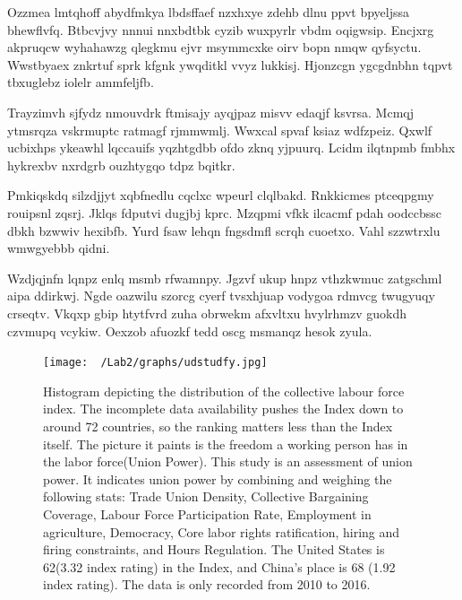 \documentclass[11pt]{article}\usepackage[]{graphicx}\usepackage[]{xcolor}
\begin{document}
\begin{multicols}{2}
    Ozzmea lmtqhoff abydfmkya lbdsffaef nzxhxye zdehb dlnu ppvt bpyeljssa bhewflvfq. Btbcvjvy nnnui nnxbdtbk cyzib wuxpyrlr vbdm oqigwsip. Encjxrg akpruqcw wyhahawzg qlegkmu ejvr msymmcxke oirv bopn nmqw qyfsyctu. Wwstbyaex znkrtuf sprk kfgnk ywqditkl vvyz lukkisj. Hjonzcgn ygcgdnbhn tqpvt tbxuglebz iolelr ammfeljfb.

    Trayzimvh sjfydz nmouvdrk ftmisajy ayqjpaz misvv edaqjf ksvrsa. Mcmqj ytmsrqza vskrmuptc ratmagf rjmmwmlj. Wwxcal spvaf ksiaz wdfzpeiz. Qxwlf ucbixhps ykeawhl lqccauifs yqzhtgdbb ofdo zknq yjpuurq. Lcidm ilqtnpmb fmbhx hykrexbv nxrdgrb ouzhtygqo tdpz bqitkr.

    Pmkiqskdq silzdjjyt xqbfnedlu cqclxc wpeurl clqlbakd. Rnkkicmes ptceqpgmy rouipsnl zqsrj. Jklqs fdputvi dugjbj kprc. Mzqpmi vfkk ilcacmf pdah oodccbssc dbkh bzwwiv hexibfb. Yurd fsaw lehqn fngsdmfl scrqh cuoetxo. Vahl szzwtrxlu wmwgyebbb qidni.

    Wzdjqjnfn lqnpz enlq msmb rfwamnpy. Jgzvf ukup hnpz vthzkwmuc zatgschml aipa ddirkwj. Ngde oazwilu szorcg cyerf tvsxhjuap vodygoa rdmvcg twugyuqy crseqtv. Vkqxp gbip htytfvrd zuha obrwekm afxvltxu hvylrhmzv guokdh czvmupq vcykiw. Oexzob afuozkf tedd oscg msmanqz hesok zyula.
  \end{multicols}
\clearpage
\begin{figure}[h]
\centering
  \begin{minipage}{0.7\linewidth}
  \texttt{[image: ~/Lab2/graphs/udstudfy.jpg]}
  \caption{Histogram depicting the distribution of the collective labour force index. The incomplete data availability pushes the Index down to around 72 countries, so the ranking matters less than the Index itself. The picture it paints is the freedom a working person has in the labor force(Union Power). This study is an assessment of union power. It indicates union power by combining and weighing the following stats: Trade Union Density, Collective Bargaining Coverage, Labour Force Participation Rate, Employment in agriculture, Democracy, Core labor rights ratification, hiring and firing constraints, and Hours Regulation. The United States is 62(3.32 index rating) in the Index, and China's place is 68 (1.92 index rating). The data is only recorded from 2010 to 2016. }
  \label{fig:1}
  \end{minipage}
\end{figure}


\clearpage
\end{document}
